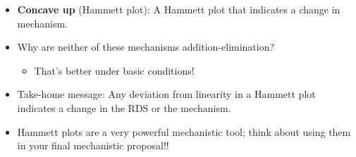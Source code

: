 \documentclass[../notes.tex]{subfiles}
\begin{document}
\begin{itemize}
\begin{figure}[h!]
\begin{subfigure}[b]{0.36\linewidth}
            \caption{Ethyl ester.}
            \label{fig:HammettEsterb}
        \end{subfigure}
        \caption{Hammett plots for ester hydrolysis.}
        \label{fig:HammettEster}
    \end{figure}
    \begin{itemize}
        \item The hydrolysis of a methyl ester displays a constant, negative sensitivity factor (Figure \ref{fig:HammettEstera}).
        \begin{itemize}
            \item This is because the positively charged acylium ion intermediate gets destabilized by stronger EWGs.
        \end{itemize}
        \item The hydrolysis of an ethyl ester displays a negative sensitivity factor for EDGs, and a positive sensitivity factor for EWGs (Figure \ref{fig:HammettEsterb}).
        \begin{itemize}
            \item When  is an EDG, the acylium ion get stabilized. Weaker EDGs stabilize it less ($\rho=-$), but we still favor the elimination-addition mechanism (Figure \ref{fig:EsterHydb}).
            \item As  becomes electron withdrawing, the mechanism in Figure \ref{fig:EsterHydc} becomes operative. This corresponds to a positive Hammett slope.
        \end{itemize}
    \end{itemize}
    \item \textbf{Concave up} (Hammett plot): A Hammett plot that indicates a change in mechanism.
    \item Why are neither of these mechanisms addition-elimination?
    \begin{itemize}
        \item That's better under basic conditions!
    \end{itemize}
    \item Take-home message: Any deviation from linearity in a Hammett plot indicates a change in the RDS or the mechanism.
    \item Hammett plots are a very powerful mechanistic tool; think about using them in your final mechanistic proposal!!
\end{itemize}
\end{document}
